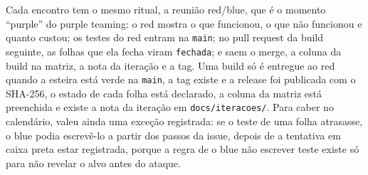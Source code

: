 Cada encontro tem o mesmo ritual, a reunião red/blue, que é o momento \enquote{purple} do purple teaming: o red mostra o que funcionou, o que não funcionou e quanto custou; os testes do red entram na \texttt{main}; no pull request da build seguinte, as folhas que ela fecha viram \texttt{fechada}; e saem o merge, a coluna da build na matriz, a nota da iteração e a tag. Uma build só é entregue ao red quando a esteira está verde na \texttt{main}, a tag existe e a release foi publicada com o SHA-256, o estado de cada folha está declarado, a coluna da matriz está preenchida e existe a nota da iteração em \texttt{docs/iteracoes/}. Para caber no calendário, valeu ainda uma exceção registrada: se o teste de uma folha atrasasse, o blue podia escrevê-lo a partir dos passos da issue, depois de a tentativa em caixa preta estar registrada, porque a regra de o blue não escrever teste existe só para não revelar o alvo antes do ataque.

